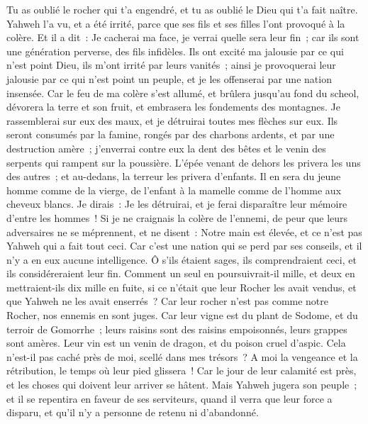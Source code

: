 \begin{multicols}{2}
Tu as oublié le rocher qui t'a engendré, et tu as oublié le Dieu qui t'a fait naître.
Yahweh l'a vu, et a été irrité, parce que ses fils et ses filles l'ont provoqué à la colère.
Et il a dit~: Je cacherai ma face, je verrai quelle sera leur fin~; car ils sont une génération perverse, des fils infidèles.
Ils ont excité ma jalousie par ce qui n'est point Dieu, ils m'ont irrité par leurs vanités~; ainsi je provoquerai leur jalousie par ce qui n'est point un peuple, et je les offenserai par une nation insensée.
Car le feu de ma colère s'est allumé, et brûlera jusqu'au fond du scheol, dévorera la terre et son fruit, et embrasera les fondements des montagnes.
Je rassemblerai sur eux des maux, et je détruirai toutes mes flèches sur eux.
Ils seront consumés par la famine, rongés par des charbons ardents, et par une destruction amère~; j'enverrai contre eux la dent des bêtes et le venin des serpents qui rampent sur la poussière.
L'épée venant de dehors les privera les uns des autres~; et au-dedans, la terreur les privera d'enfants. Il en sera du jeune homme comme de la vierge, de l'enfant à la mamelle comme de l'homme aux cheveux blancs.
Je dirais~: Je les détruirai, et je ferai disparaître leur mémoire d'entre les hommes~!
Si je ne craignais la colère de l'ennemi, de peur que leurs adversaires ne se méprennent, et ne disent~: Notre main est élevée, et ce n'est pas Yahweh qui a fait tout ceci.
Car c'est une nation qui se perd par ses conseils, et il n'y a en eux aucune intelligence.
Ô s'ils étaient sages, ils comprendraient ceci, et ils considéreraient leur fin.
Comment un seul en poursuivrait-il mille, et deux en mettraient-ils dix mille en fuite, si ce n'était que leur Rocher les avait vendus, et que Yahweh ne les avait enserrés~?
Car leur rocher n'est pas comme notre Rocher, nos ennemis en sont juges.
Car leur vigne est du plant de Sodome, et du terroir de Gomorrhe~; leurs raisins sont des raisins empoisonnés, leurs grappes sont amères.
Leur vin est un venin de dragon, et du poison cruel d'aspic.
Cela n'est-il pas caché près de moi, scellé dans mes trésors~?
A moi la vengeance et la rétribution, le temps où leur pied glissera~! Car le jour de leur calamité est près, et les choses qui doivent leur arriver se hâtent.
Mais Yahweh jugera son peuple~; et il se repentira en faveur de ses serviteurs, quand il verra que leur force a disparu, et qu'il n'y a personne de retenu ni d'abandonné.

\end{multicols}
